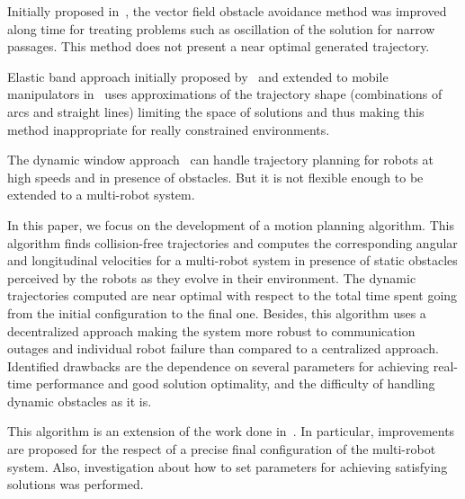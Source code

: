 \documentclass[eprint]{actapoly}
\begin{document}
 

Initially proposed in~\cite{Khatib1986}, the vector field obstacle avoidance 
method was improved along time for treating problems such as oscillation of the 
solution for narrow passages. This method does not present a near optimal 
generated trajectory.

 

Elastic band approach initially proposed by~\cite{Quinlan1994} and extended to 
mobile manipulators in~\cite{Brock et Khatib, 1998} uses approximations of the 
trajectory shape (combinations of arcs and straight lines) limiting the space 
of solutions and thus making this method inappropriate for really constrained 
environments.

 

The dynamic window approach~\cite{Fox1997} can handle trajectory 
planning for robots at high speeds and in presence of obstacles. But it is not 
flexible enough to be extended to a multi-robot system.

 


In this paper, we focus on the development of a motion planning algorithm. 
This algorithm finds collision-free trajectories and computes the corresponding
angular and longitudinal velocities for a multi-robot system in 
presence of static obstacles perceived by the robots as they evolve 
in their environment. The dynamic trajectories computed are near optimal with 
respect to the total time spent going from the initial configuration to the 
final one. Besides, this algorithm uses a decentralized approach making the 
system more robust to communication outages and individual robot failure than 
compared to a centralized approach. Identified drawbacks are the dependence on 
several parameters for achieving real-time performance and good solution 
optimality, and the difficulty of handling dynamic obstacles as it is.

 

This algorithm is an extension of the work done in~\cite{Defoort2007a}. In particular,
improvements are proposed for the respect of a precise final configuration of the 
multi-robot system. Also, investigation about how to set parameters for achieving
satisfying solutions was performed.


 

\end{document}
